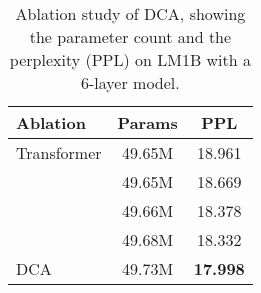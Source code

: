 \begin{table}[h]
    \vskip -0.1in
    \caption{Ablation study of DCA, showing the parameter count and the perplexity (PPL) on LM1B with a 6-layer model.}
    \label{tab:ablation}
    \vskip 0.15in
    \begin{center}
    \begin{small}
    \begin{sc}
    \begin{tabular}{l|cc}
        \toprule
         Ablation & Params & PPL  \\
        \midrule
         Transformer & 49.65M & 18.961 \\
         \GenA{} & 49.65M & 18.669 \\ 
         \GenB{} & 49.66M & 18.378 \\ 
         \GenC{} & 49.68M & 18.332 \\
         DCA & 49.73M & \textbf{17.998} \\
         \bottomrule
    \end{tabular}
    \end{sc}
    \end{small}
    \end{center}
    \vskip -0.1in
\end{table}






